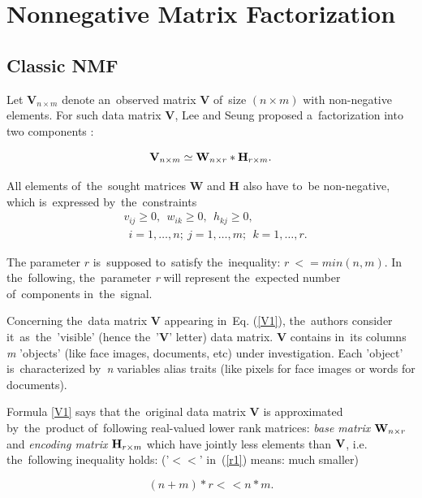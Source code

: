 \section{Nonnegative Matrix Factorization}

\subsection{Classic NMF}\label{app_nmf}

Let $\mathbf{V}_{n\times m}$ denote an~observed matrix $\mathbf V$ of~size $(n\times m)$ with non-negative elements. For such data matrix ${\mathbf V}$, Lee and Seung proposed a~factorization into two components \cite{lee2001algorithms}:

\begin{equation}\label{V1} 
{\bf V}_{n\times m}\simeq
   {\bf W}_{n\times r}*{\bf H}_{r\times m}.
\end{equation}

All elements of~the~sought matrices ${\mathbf W}$ and ${\mathbf H}$ also have to~be
non-negative, which is~expressed by~the~constraints
\begin{align*}
  &v_{ij}\ge0,~~w_{ik}\ge 0,~~h_{kj}\ge 0,\\
  &~~i=1, \dots, n; ~j=1,\dots, m;
        ~~k=1,\dots,r.
\end{align*}

The parameter $r$ is~supposed to~satisfy the~inequality: \mbox{$r~<= min(n,m)$}.
In the~following, the~parameter \emph{r} will represent the~expected number of~components in~the~signal.


Concerning the~data matrix \textbf{V} appearing in~Eq. (\ref{V1}), the~authors \cite{lee1999learning} consider it~as~the~'visible' (hence the~'\textbf{V}' letter) data matrix. \textbf{V} contains in~its columns \textit{m} 'objects' (like face images, documents, etc) under investigation. Each 'object' is~characterized by~\textit{n}
variables alias traits (like pixels for face images or words for documents).

Formula \ref{V1} says that the~original data matrix \textbf{V} is
approximated by~the~product of~following real-valued lower rank matrices: \emph{base matrix} ${\bf W}_{n\times r}$ and \emph{encoding matrix} ${\bf H}_{r\times m}$ which have jointly less elements than ${\bf V}$, i.e. the~following inequality holds:
('$< <$' in~(\ref{r1}) means: much smaller)

\begin{equation}\label{r1}
  (n+m)*r<\hspace{1pt}< n*m .
\end{equation}

